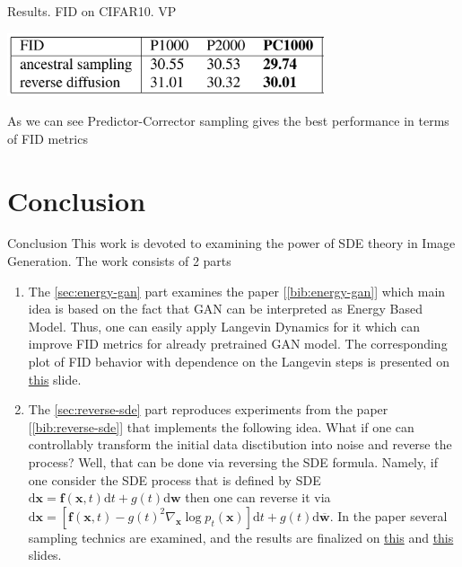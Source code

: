 \documentclass[xcolor=dvipsnames]{beamer}
\begin{document}
    \begin{frame}{\hypertarget{frame:res-vp}{Results. FID on CIFAR10. VP}}            
        \begin{center}
            \includegraphics[width=0.7\textwidth]{pics/VP_table.png}
        \end{center}
        As we can see Predictor-Corrector sampling gives the best performance in terms of
        FID metrics
    \end{frame}
    \section{Conclusion}
    \begin{frame}{Conclusion}
        This work is devoted to examining the power of SDE theory in Image Generation.
        The work consists of 2 parts
        \begin{enumerate}
            \item The \ref{sec:energy-gan} part examines the paper [\ref{bib:energy-gan}] which main idea is based on the fact
            that GAN can be interpreted as Energy Based Model. Thus, one can easily
            apply Langevin Dynamics for it which can improve FID metrics for already pretrained 
            GAN model. The corresponding plot of FID behavior with dependence on  
            the Langevin steps is presented on \textcolor{blue}{\hyperlink{frame:res-energy}{this}} slide.
            \item The \ref{sec:reverse-sde} part reproduces experiments from the paper 
            [\ref{bib:reverse-sde}] that implements the following 
            idea. What if one can controllably transform the initial data disctibution into
            noise and reverse the process? Well, that can be done via reversing the SDE formula. Namely, 
            if one consider the SDE process that is defined by SDE 
            $\mathrm{d} \mathbf{x}=\mathbf{f}(\mathbf{x}, t) \mathrm{d} t+g(t) \mathrm{d} \mathbf{w}$
            then one can reverse it via 
            $\mathrm{d} \mathbf{x}=\left[\mathbf{f}(\mathbf{x}, t)-g(t)^2 \nabla_{\mathbf{x}} \log p_t(\mathbf{x})\right] \mathrm{d} t+g(t) \mathrm{d} \overline{\mathbf{w}}$. 
            In the paper several sampling technics are examined, and the results are finalized on 
            \textcolor{blue}{\hyperlink{frame:res-ve}{this}} and 
            \textcolor{blue}{\hyperlink{frame:res-vp}{this}} slides. 
        \end{enumerate}
    \end{frame}
\end{document}
